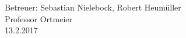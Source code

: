 \begin{center}
Betreuer: Sebastian Nielebock, Robert Heumüller\\
Professor Ortmeier\\
13.2.2017
\end{center}

\newpage